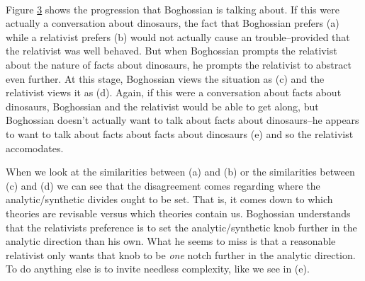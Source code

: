 \documentclass[12pt]{article}
\begin{document}
\begin{flushleft}
\begin{figure}[h]
\begin{subfigure}{.20\linewidth}
{            \subproof
            {
            }
            {
                \subproof
                {
                    \pline{\mathnormal{\alpha}}
                }
                {
                }
            }
        }
        \caption{}
        \label{dinosaur3}
     \end{subfigure}%
     \begin{subfigure}{.20\linewidth}
        \centering
        \hspace*{2em}%
        \fitchprf
        {
        }
        {
            \pline{\bigstar} \\
            \subproof
            {
            }
            {
                \subproof
                {
                    \pline{\mathnormal{\alpha}}
                }
                {
                }
            }
        }
        \caption{}
        \label{dinosaur4}
    \end{subfigure}
    \caption{}
    \label{dinosaur}
\end{figure}


Figure \ref{dinosaur} shows the progression that Boghossian is talking about.
If this were actually a conversation about dinosaurs, the fact that Boghossian prefers (a) while a relativist prefers (b) would not actually cause an trouble--provided that the relativist was well behaved.
But when Boghossian prompts the relativist about the nature of facts about dinosaurs, he prompts the relativist to abstract even further.
At this stage, Boghossian views the situation as (c) and the relativist views it as (d).
Again, if this were a conversation about facts about dinosaurs, Boghossian and the relativist would be able to get along, but Boghossian doesn't actually want to talk about facts about dinosaurs--he appears to want to talk about facts about facts about dinosaurs (e) and so the relativist accomodates.

When we look at the similarities between (a) and (b) or the similarities between (c) and (d) we can see that the disagreement comes regarding where the analytic/synthetic divides ought to be set.
That is, it comes down to which theories are revisable versus which theories contain us.
Boghossian understands that the relativists preference is to set the analytic/synthetic knob further in the analytic direction than his own.
What he seems to miss is that a reasonable relativist only wants that knob to be \textit{one} notch further in the analytic direction.
To do anything else is to invite needless complexity, like we see in (e).


\end{flushleft}
\end{document}

